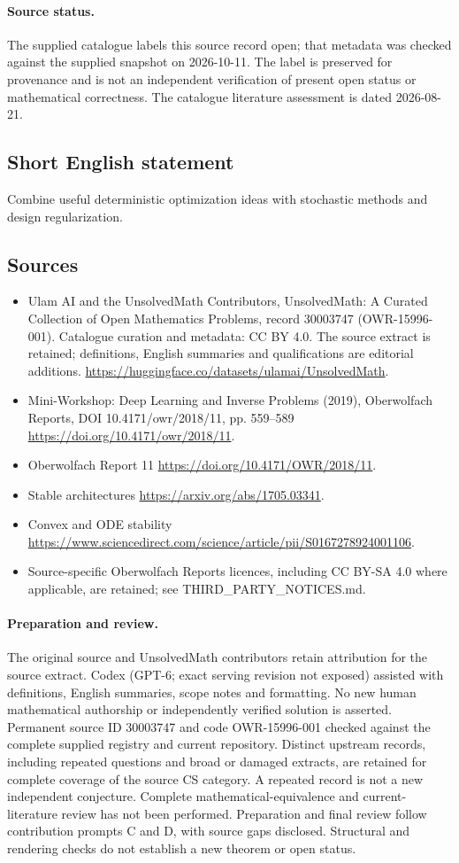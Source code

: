 \documentclass[11pt]{article}
\begin{document}
\paragraph{Source status.}
The supplied catalogue labels this source record open; that metadata was checked against the supplied snapshot on 2026-10-11. The label is preserved for provenance and is not an independent verification of present open status or mathematical correctness. The catalogue literature assessment is dated 2026-08-21.
\subsection{Short English statement}
Combine useful deterministic optimization ideas with stochastic methods and design regularization.
\subsection{Sources}
\begin{itemize}
\item[S1] Ulam AI and the UnsolvedMath Contributors, UnsolvedMath: A Curated Collection of Open Mathematics Problems, record 30003747 (OWR-15996-001). Catalogue curation and metadata: CC BY 4.0. The source extract is retained; definitions, English summaries and qualifications are editorial additions.
\url{https://huggingface.co/datasets/ulamai/UnsolvedMath}.
\item[S2] Mini-Workshop: Deep Learning and Inverse Problems (2019), Oberwolfach Reports, DOI 10.4171/owr/2018/11, pp. 559--589
\url{https://doi.org/10.4171/owr/2018/11}.
\item[S3] Oberwolfach Report 11
\url{https://doi.org/10.4171/OWR/2018/11}.
\item[S4] Stable architectures
\url{https://arxiv.org/abs/1705.03341}.
\item[S5] Convex and ODE stability
\url{https://www.sciencedirect.com/science/article/pii/S0167278924001106}.
\item Source-specific Oberwolfach Reports licences, including CC BY-SA 4.0 where applicable, are retained; see THIRD\_PARTY\_NOTICES.md.
\end{itemize}
\paragraph{Preparation and review.}
The original source and UnsolvedMath contributors retain attribution for the source extract. Codex (GPT-6; exact serving revision not exposed) assisted with definitions, English summaries, scope notes and formatting. No new human mathematical authorship or independently verified solution is asserted. Permanent source ID 30003747 and code OWR-15996-001 checked against the complete supplied registry and current repository. Distinct upstream records, including repeated questions and broad or damaged extracts, are retained for complete coverage of the source CS category. A repeated record is not a new independent conjecture. Complete mathematical-equivalence and current-literature review has not been performed. Preparation and final review follow contribution prompts C and D, with source gaps disclosed. Structural and rendering checks do not establish a new theorem or open status.
\label{end:30003747}
\end{document}
